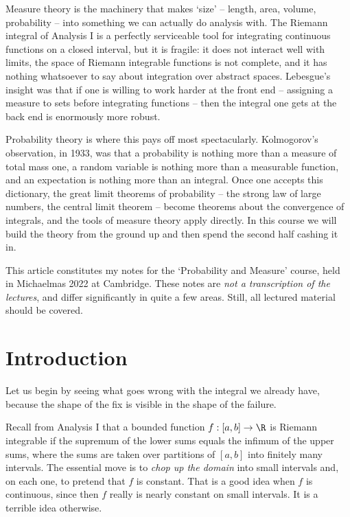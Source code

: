 



Measure theory is the machinery that makes `size' -- length, area, volume, probability -- into something we can actually do analysis with. The Riemann integral of Analysis I is a perfectly serviceable tool for integrating continuous functions on a closed interval, but it is fragile: it does not interact well with limits, the space of Riemann integrable functions is not complete, and it has nothing whatsoever to say about integration over abstract spaces. Lebesgue's insight was that if one is willing to work harder at the front end -- assigning a measure to sets before integrating functions -- then the integral one gets at the back end is enormously more robust.

Probability theory is where this pays off most spectacularly. Kolmogorov's observation, in 1933, was that a probability is nothing more than a measure of total mass one, a random variable is nothing more than a measurable function, and an expectation is nothing more than an integral. Once one accepts this dictionary, the great limit theorems of probability -- the strong law of large numbers, the central limit theorem -- become theorems about the convergence of integrals, and the tools of measure theory apply directly. In this course we will build the theory from the ground up and then spend the second half cashing it in.

This article constitutes my notes for the `Probability and Measure' course, held in Michaelmas 2022 at Cambridge. These notes are \emph{not a transcription of the lectures}, and differ significantly in quite a few areas. Still, all lectured material should be covered.



\section{Introduction}

Let us begin by seeing what goes wrong with the integral we already have, because the shape of the fix is visible in the shape of the failure.

Recall from Analysis I that a bounded function $f : [a,b] \to \R$ is Riemann integrable if the supremum of the lower sums equals the infimum of the upper sums, where the sums are taken over partitions of $[a,b]$ into finitely many intervals. The essential move is to \emph{chop up the domain} into small intervals and, on each one, to pretend that $f$ is constant. That is a good idea when $f$ is continuous, since then $f$ really is nearly constant on small intervals. It is a terrible idea otherwise.

